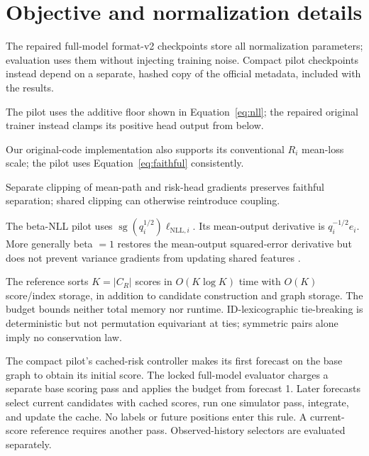 


\section{Objective and normalization details}
\label{sec:implementation-details}
The repaired full-model format-v2 checkpoints store all normalization parameters; evaluation uses them without injecting training noise. Compact pilot checkpoints instead depend on a separate, hashed copy of the official metadata, included with the results.

The pilot uses the additive floor shown in Equation~\ref{eq:nll}; the repaired original trainer instead clamps its positive head output from below.

Our original-code implementation also supports its conventional $R_i$ mean-loss scale; the pilot uses Equation~\ref{eq:faithful} consistently.

Separate clipping of mean-path and risk-head gradients preserves faithful separation; shared clipping can otherwise reintroduce coupling.

The beta-NLL pilot uses
$\operatorname{sg}(q_i^{1/2})\ell_{\mathrm{NLL},i}$.
Its mean-output derivative is $q_i^{-1/2}e_i$. More generally beta $=1$ restores the mean-output squared-error derivative but does not prevent variance gradients from updating shared features \citep{stirn2023}.

The reference sorts $K=|C_R|$ scores in $O(K\log K)$ time with $O(K)$ score/index storage, in addition to candidate construction and graph storage. The budget bounds neither total memory nor runtime. ID-lexicographic tie-breaking is deterministic but not permutation equivariant at ties; symmetric pairs alone imply no conservation law.

The compact pilot's cached-risk controller makes its first forecast on the base graph to obtain its initial score. The locked full-model evaluator charges a separate base scoring pass and applies the budget from forecast 1. Later forecasts select current candidates with cached scores, run one simulator pass, integrate, and update the cache. No labels or future positions enter this rule. A current-score reference requires another pass. Observed-history selectors are evaluated separately.

